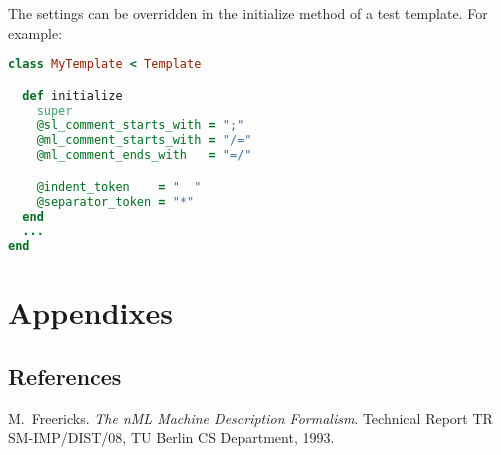 \documentclass[oneside,final,14pt]{extreport}
\begin{document}
The settings can be overridden in the initialize method of a test template. For example:

\begin{lstlisting}[language=ruby]
class MyTemplate < Template

  def initialize
    super
    @sl_comment_starts_with = ";" 
    @ml_comment_starts_with = "/="
    @ml_comment_ends_with   = "=/"

    @indent_token    = "  "
    @separator_token = "*" 
  end
  ...
end
\end{lstlisting}


\chapter{Appendixes}

\section{References}



\begin{thebibliography}{1}

M.~Freericks.
\emph{The nML Machine Description Formalism}.
Technical Report TR SM-IMP/DIST/08, TU Berlin CS Department, 1993.

\end{thebibliography}
\end{document}
